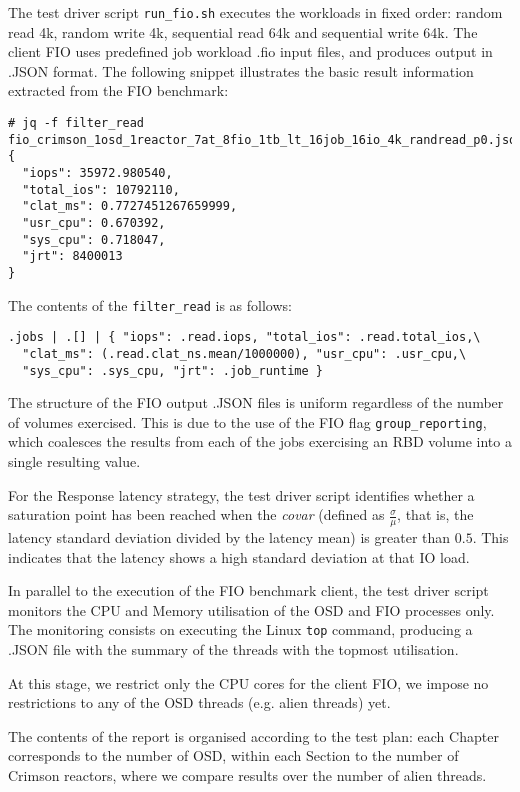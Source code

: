 The test driver script {\tt run\_fio.sh} executes the workloads in fixed order: random read 4k, random write 4k, sequential read 64k and sequential write 64k. The client FIO uses predefined job workload .fio input files, and produces output in .JSON format. The following snippet illustrates the basic result information extracted
from the FIO benchmark:

\begin{verbatim}
# jq -f filter_read fio_crimson_1osd_1reactor_7at_8fio_1tb_lt_16job_16io_4k_randread_p0.json
{
  "iops": 35972.980540,
  "total_ios": 10792110,
  "clat_ms": 0.7727451267659999,
  "usr_cpu": 0.670392,
  "sys_cpu": 0.718047,
  "jrt": 8400013
}
\end{verbatim}

The contents of the {\tt filter\_read} is as follows:
\begin{verbatim}
.jobs | .[] | { "iops": .read.iops, "total_ios": .read.total_ios,\
  "clat_ms": (.read.clat_ns.mean/1000000), "usr_cpu": .usr_cpu,\
  "sys_cpu": .sys_cpu, "jrt": .job_runtime }
\end{verbatim}

The structure of the FIO output .JSON files is uniform regardless of the number of volumes exercised. This is
due to the use of the FIO flag {\tt group\_reporting}, which coalesces the results from each of the jobs
exercising an RBD volume into a single resulting value.

For the Response latency strategy, the test driver script identifies whether a saturation point has been
reached when the {\it covar} (defined as $\frac{\sigma}{\mu}$, that is, the latency standard deviation
divided by the latency mean) is greater than $0.5$. This indicates that the latency shows a high standard
deviation at that IO load. 

In parallel to the execution of the FIO benchmark client, the test driver script monitors the CPU and Memory
utilisation of the OSD and FIO processes only.
The monitoring consists on executing the Linux {\tt top} command, producing a .JSON file with the summary of
the threads with the topmost utilisation. 

At this stage, we restrict only the CPU cores for the client FIO, 
we impose no restrictions to any of the OSD threads (e.g. alien threads) yet.

The contents of the report is organised according to the test plan: each Chapter
corresponds to the number of OSD, within each Section to the number of Crimson 
reactors, where we compare results over the number of alien threads.
